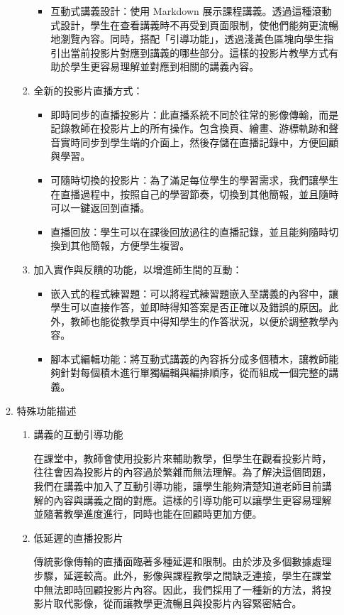 \documentclass[12pt]{article}
\begin{document}
\begin{enumerate}
\begin{enumerate}
\begin{enumerate}[label=(\arabic*)]
\begin{itemize}
            \item 互動式講義設計：使用 Markdown 展示課程講義。透過這種滾動式設計，學生在查看講義時不再受到頁面限制，使他們能夠更流暢地瀏覽內容。同時，搭配「引導功能」，透過淺黃色區塊向學生指引出當前投影片對應到講義的哪些部分。這樣的投影片教學方式有助於學生更容易理解並對應到相關的講義內容。
          \end{itemize}
          \item 全新的投影片直播方式：
          \begin{itemize}
            \item 即時同步的直播投影片：此直播系統不同於往常的影像傳輸，而是記錄教師在投影片上的所有操作。包含換頁、繪畫、游標軌跡和聲音實時同步到學生端的介面上，然後存儲在直播記錄中，方便回顧與學習。
            \item 可隨時切換的投影片：為了滿足每位學生的學習需求，我們讓學生在直播過程中，按照自己的學習節奏，切換到其他簡報，並且隨時可以一鍵返回到直播。
            \item 直播回放：學生可以在課後回放過往的直播記錄，並且能夠隨時切換到其他簡報，方便學生複習。
          \end{itemize}
          \item 加入實作與反饋的功能，以增進師生間的互動：
          \begin{itemize}
            \item 嵌入式的程式練習題：可以將程式練習題嵌入至講義的內容中，讓學生可以直接作答，並即時得知答案是否正確以及錯誤的原因。此外，教師也能從教學頁中得知學生的作答狀況，以便於調整教學內容。
            \item 腳本式編輯功能：將互動式講義的內容拆分成多個積木，讓教師能夠針對每個積木進行單獨編輯與編排順序，從而組成一個完整的講義。
          \end{itemize}
        \end{enumerate}
      \item 特殊功能描述
        \begin{enumerate}[label=(\arabic*)]
          \setlength{\parindent}{2em}
          \item 講義的互動引導功能
          \par 在課堂中，教師會使用投影片來輔助教學，但學生在觀看投影片時，往往會因為投影片的內容過於繁雜而無法理解。為了解決這個問題，我們在講義中加入了互動引導功能，讓學生能夠清楚知道老師目前講解的內容與講義之間的對應。這樣的引導功能可以讓學生更容易理解並隨著教學進度進行，同時也能在回顧時更加方便。
          \item 低延遲的直播投影片
          \par 傳統影像傳輸的直播面臨著多種延遲和限制。由於涉及多個數據處理步驟，延遲較高。此外，影像與課程教學之間缺乏連接，學生在課堂中無法即時回顧投影片內容。因此，我們採用了一種新的方法，將投影片取代影像，從而讓教學更流暢且與投影片內容緊密結合。

\end{enumerate}
\end{enumerate}
\end{enumerate}
\end{document}
